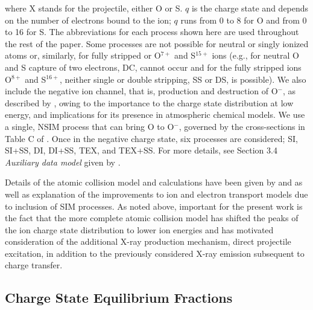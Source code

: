 \documentclass[draft]{agujournal2018}
\begin{document}
where X stands for the projectile, either O or S. $q$ is the charge state and depends on the number of electrons bound to the ion; $q$ runs from 0 to 8 for O and from 0 to 16 for S.
The abbreviations for each process shown here are used throughout the rest of the paper.
Some processes are not possible for neutral or singly ionized atoms or, similarly, for fully stripped or O$^{7+}$ and S$^{15+}$ ions (e.g., for neutral O and S capture of two electrons, DC, cannot occur and for the fully stripped ions O$^{8+}$ and S$^{16+}$, neither single or double stripping, SS or DS, is possible).
We also include the negative ion channel, that is, production and destruction of O$^-$, as described by \citet{schultz2019}, owing to the importance to the charge state distribution at low energy, and implications for its presence in atmospheric chemical models. 
We use a single, NSIM process that can bring O to O$^-$, governed by the cross-sections in Table C of \citet{schultz2019}.
Once in the negative charge state, six processes are considered; SI, SI+SS, DI, DI+SS, TEX, and TEX+SS.
For more details, see Section 3.4 \textit{Auxiliary data model} given by \citet{schultz2019}.

Details of the atomic collision model and calculations have been given by \citet{schultz2019} and \citet{gharibnejad2019} as well as explanation of the improvements to ion and electron transport models due to inclusion of SIM processes.
As noted above, important for the present work is the fact that the more complete atomic collision model has shifted the peaks of the ion charge state distribution to lower ion energies and has motivated consideration of the additional X-ray production mechanism, direct projectile excitation, in addition to the previously considered X-ray emission subsequent to charge transfer.

\subsection{Charge State Equilibrium Fractions}
\end{document}
